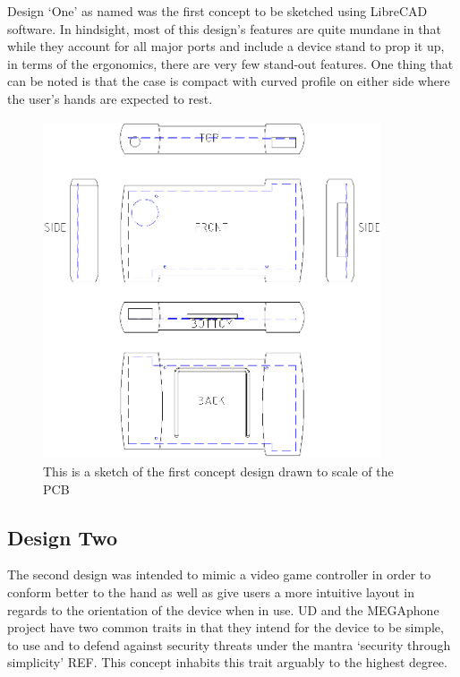 Design ‘One’ as named was the first concept to be sketched using LibreCAD software. 
In hindsight, most of this design’s features are quite mundane in that while they account for all major ports and include a device stand to prop it up, in terms of the ergonomics, there are very few stand-out features. 
One thing that can be noted is that the case is compact with curved profile on either side where the user’s hands are expected to rest.

\begin{figure}[hbt!]
\centering
\includegraphics[width=10cm,height=10cm,keepaspectratio]{Figures/design1_sketch.png}
\caption{This is a sketch of the first concept design drawn to scale of the PCB}
\label{fig:Design_1}
\end{figure}

\subsection{Design Two}

The second design was intended to mimic a video game controller in order to conform better to the hand as well as give users a more intuitive layout in regards to the orientation of the device when in use. 
UD and the MEGAphone project have two common traits in that they intend for the device to be simple, to use and to defend against security threats under the mantra ‘security through simplicity’ REF. 
This concept inhabits this trait arguably to the highest degree.

